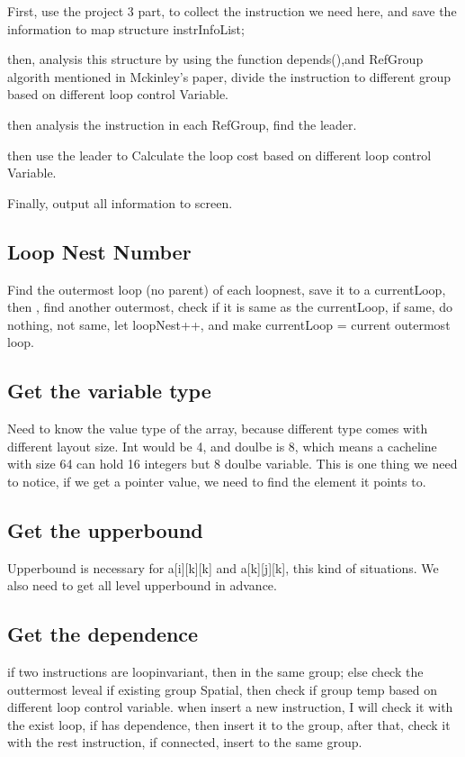 First, use the project 3 part, to collect the  instruction we need here,
and save the information to map structure  instrInfoList;

then, analysis this structure by using the function depends(),and RefGroup
algorith mentioned in Mckinley's paper, divide the instruction to
different group based on different loop control Variable.


then analysis the instruction in each RefGroup, find the leader.

then use the leader to Calculate the loop cost based on different loop
control Variable.

Finally, output all information to screen.

\subsection{Loop Nest Number} 
Find the outermost loop (no parent) of each loopnest, save it to a
currentLoop, then , find another outermost, check if it is same as the
currentLoop, if same, do nothing, not same, let loopNest++, and make
currentLoop = current outermost loop.

\subsection{Get the variable type} 
Need to know the value type of the array, because different type comes
with different layout size. Int would be 4, and doulbe is 8, which
means a cacheline with size 64 can hold 16 integers but 8 doulbe variable. 
This is one thing we need to notice, if we get a pointer value, we
need to find the element it points to.

\subsection{Get the upperbound}
Upperbound is necessary for a[i][k][k] and a[k][j][k], this kind of
situations. We also need to get all level upperbound in advance.


\subsection{Get the dependence} 
 if two instructions are loopinvariant, then in the same group;
else check the outtermost leveal if existing group Spatial, then check
if group temp based on different loop control variable. when insert a
new instruction, I will check it with the exist loop, if has
dependence, then insert it to the group, after that, check it with the
rest instruction, if connected, insert to the same group.

